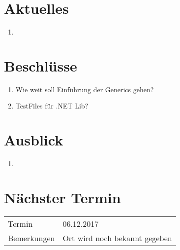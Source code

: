 \documentclass[11pt, a4paper,oneside]{scrartcl}
\begin{document}
	\section{Aktuelles}
	\begin{enumerate}
		\item 
	\end{enumerate}
	
	\section{Beschlüsse}
	\begin{enumerate}
		\item Wie weit soll Einführung der Generics gehen?
		\item TestFiles für .NET Lib?
	\end{enumerate} 
	
	\section{Ausblick}
	\begin{enumerate}
		\item 
	\end{enumerate}
	
	\section{Nächster Termin}
	\begin{tabu} to \linewidth {l X }
		\toprule
		Termin & 06.12.2017  \\
		Bemerkungen & Ort wird noch bekannt gegeben  \\
		\bottomrule
	\end{tabu}
	
\end{document}
